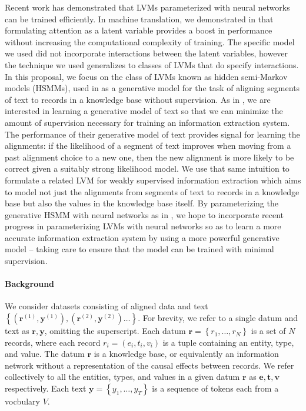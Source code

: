 \documentclass[11pt]{article}
\newcommand\set[1]{\left\{#1\right\}}
\newcommand{\be}{\mathbf{e}}
\newcommand{\br}{\mathbf{r}}
\newcommand{\bt}{\mathbf{t}}
\newcommand{\bv}{\mathbf{v}}
\newcommand{\by}{\mathbf{y}}
\begin{document}
Recent work has demonstrated that LVMs parameterized with neural networks can be trained efficiently.
In machine translation, we demonstrated in \citet{deng2018attn} that formulating attention as
a latent variable provides a boost in performance without increasing the computational complexity of training.
The specific model we used did not incorporate interactions between the latent variables,
however the technique we used generalizes to classes of LVMs that do specify interactions.
In this proposal, we focus on the class of LVMs known as hidden semi-Markov models (HSMMs),
used in \citet{liang2009semalign} as a generative model for the task of aligning segments of text to
records in a knowledge base without supervision.
As in \citet{liang2009semalign}, we are interested in learning a generative model of text so that
we can minimize the amount of supervision necessary for training an information extraction system.
The performance of their generative model of text provides signal for learning the alignments:
if the likelihood of a segment of text improves when moving from a past alignment choice to a new one,
then the new alignment is more likely to be correct given a suitably strong likelihood model.
We use that same intuition to formulate a related LVM for weakly supervised information extraction
which aims to model not just the alignments from segments of text to records in a knowledge base
but also the values in the knowledge base itself.
By parameterizing the generative HSMM with neural networks as in \citet{wiseman2018template},
we hope to incorporate recent progress in parameterizing LVMs with neural networks
so as to learn a more accurate information extraction system by using a more powerful
generative model -- taking care to ensure that the model can be trained with minimal supervision.

\paragraph{Background}
We consider datasets consisting of aligned data and text
$\set{(\br^{(1)}, \by^{(1)}),(\br^{(2)},\by^{(2)})\ldots}$.
For brevity, we refer to a single datum and text as $\br,\by$, omitting the superscript.
Each datum $\br = \set{r_1,\ldots,r_N}$ is a set of $N$ records, where each record $r_i = (e_i, t_i, v_i)$
is a tuple containing an entity, type, and value.
The datum $\br$ is a knowledge base, or equivalently an information network
without a representation of the causal effects between records.
We refer collectively to all the entities, types, and values in a given datum $\br$ as
$\be,\bt,\bv$ respectively.
Each text $\by = \set{y_1,\ldots,y_T}$ is a sequence of tokens each from a vocbulary $V$.
\end{document}
